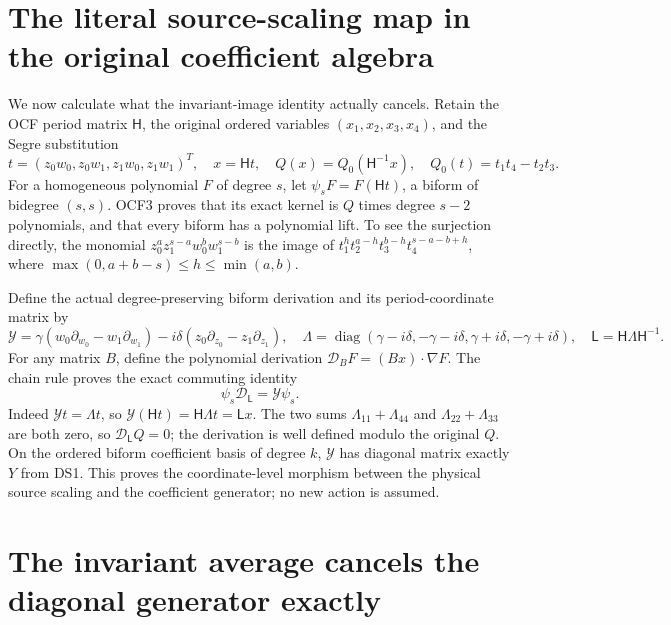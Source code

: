 \documentclass[11pt]{article}
\newcommand{\calD}{\mathscr D}
\begin{document}
\section{The literal source-scaling map in the original coefficient algebra}

We now calculate what the invariant-image identity actually cancels.
Retain the OCF period matrix \(\mathsf H\), the original ordered
variables \((x_1,x_2,x_3,x_4)\), and the Segre substitution
\[
t=(z_0w_0,z_0w_1,z_1w_0,z_1w_1)^T,\quad x=\mathsf Ht,
\quad Q(x)=Q_0(\mathsf H^{-1}x),\quad
Q_0(t)=t_1t_4-t_2t_3.
\]
For a homogeneous polynomial \(F\) of degree \(s\), let
\(\psi_sF=F(\mathsf Ht)\), a biform of bidegree \((s,s)\).
OCF3 proves that its exact kernel is \(Q\) times degree \(s-2\)
polynomials, and that every biform has a polynomial lift. To see the
surjection directly, the monomial
\(z_0^a z_1^{s-a}w_0^b w_1^{s-b}\) is the image of
\(t_1^h t_2^{a-h}t_3^{b-h}t_4^{s-a-b+h}\), where
\(\max(0,a+b-s)\leq h\leq\min(a,b)\).

Define the actual degree-preserving biform derivation and its
period-coordinate matrix by
\begin{equation}\label{eq:generator}
\mathcal Y=\gamma(w_0\partial_{w_0}-w_1\partial_{w_1})
-i\delta(z_0\partial_{z_0}-z_1\partial_{z_1}),\quad
\Lambda=\operatorname{diag}(\gamma-i\delta,-\gamma-i\delta,
\gamma+i\delta,-\gamma+i\delta),\quad
\mathsf L=\mathsf H\Lambda\mathsf H^{-1}.
\tag{DS21}
\end{equation}
For any matrix \(B\), define the polynomial derivation
\(\calD_BF=(Bx)\cdot\nabla F\). The chain rule proves the exact
commuting identity
\begin{equation}\label{eq:generator-map}
\psi_s\calD_{\mathsf L}=\mathcal Y\psi_s.
\tag{DS22}
\end{equation}
Indeed \(\mathcal Yt=\Lambda t\), so
\(\mathcal Y(\mathsf Ht)=\mathsf H\Lambda t=\mathsf Lx\).
The two sums \(\Lambda_{11}+\Lambda_{44}\) and
\(\Lambda_{22}+\Lambda_{33}\) are both zero, so
\(\calD_{\mathsf L}Q=0\); the derivation is well defined modulo
the original \(Q\). On the ordered biform coefficient basis of degree
\(k\), \(\mathcal Y\) has diagonal matrix exactly \(Y\) from DS1.
This proves the coordinate-level morphism between the physical source
scaling and the coefficient generator; no new action is assumed.

\section{The invariant average cancels the diagonal generator exactly}
\end{document}
